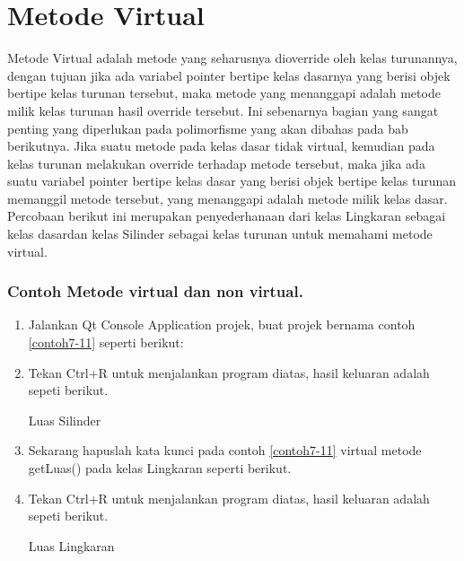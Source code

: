 \section{Metode Virtual}\label{metode-virtual}

Metode Virtual adalah metode yang seharusnya dioverride oleh kelas
turunannya, dengan tujuan jika ada variabel pointer bertipe kelas
dasarnya yang berisi objek bertipe kelas turunan tersebut, maka metode
yang menanggapi adalah metode milik kelas turunan hasil override
tersebut. Ini sebenarnya bagian yang sangat penting yang diperlukan pada
polimorfisme yang akan dibahas pada bab berikutnya. Jika suatu metode
pada kelas dasar tidak virtual, kemudian pada kelas turunan melakukan
override terhadap metode tersebut, maka jika ada suatu variabel pointer
bertipe kelas dasar yang berisi objek bertipe kelas turunan memanggil
metode tersebut, yang menanggapi adalah metode milik kelas dasar.
Percobaan berikut ini merupakan penyederhanaan dari kelas Lingkaran
sebagai kelas dasardan kelas Silinder sebagai kelas turunan untuk
memahami metode virtual.

\subsubsection*{Contoh  Metode virtual dan non virtual.}

\begin{enumerate}

\item
  Jalankan Qt Console Application projek, buat projek bernama contoh \ref{contoh7-11}
  seperti berikut:




\item
  Tekan Ctrl+R untuk menjalankan program diatas, hasil keluaran adalah
  sepeti berikut.

\begin{lcverbatim}
Luas Silinder
\end{lcverbatim} 
\item
  Sekarang hapuslah kata kunci pada contoh \ref{contoh7-11} virtual metode getLuas() pada kelas
  Lingkaran seperti berikut.



\item
  Tekan Ctrl+R untuk menjalankan program diatas, hasil keluaran adalah
  sepeti berikut.


\begin{lcverbatim}
Luas Lingkaran
\end{lcverbatim} 
\end{enumerate}

